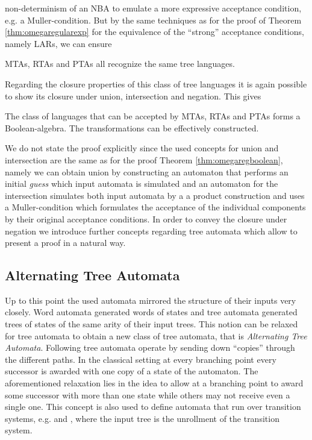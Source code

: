 non-determinism of an \ac{NBA} to emulate a more expressive acceptance 
condition, e.g. a Muller-condition. But by the same techniques as for the proof 
of Theorem \ref{thm:omegaregularexp} for the equivalence of the 
\enquote{strong} acceptance conditions, namely \acp{LAR}, we can ensure
\begin{theorem}
  \cite[Theorem 8.7]{AutoLogInfGames}
  \acp{MTA}, \acp{RTA} and \acp{PTA} all recognize the same tree languages.
  \label{thm:treeautoequiv}
\end{theorem}
Regarding the closure properties of this class of tree languages it is again
possible to show its closure under union, intersection and negation. This gives
\begin{theorem}
  \cite[Theorem 1.3]{SOTheoAndTrees}
  \cite[Theorem 1.5]{SOTheoAndTrees}
  The class of languages that can be accepted by \acp{MTA}, \acp{RTA} and 
  \acp{PTA} forms a Boolean-algebra. The transformations can be effectively
  constructed.
  \label{thm:treeautoboolean}
\end{theorem}
We do not state the proof explicitly since the used concepts for union and
intersection are the same as for the proof Theorem \ref{thm:omegaregboolean},
namely we can obtain union by constructing an automaton that performs an 
initial \emph{guess} which input automata is simulated and an automaton for the
intersection simulates both input automata by a a product construction and uses 
a Muller-condition which formulates the acceptance of the individual components 
by their original acceptance conditions. In order to convey the closure under
negation we introduce further concepts regarding tree automata which allow to
present a proof in a natural way.

\subsection{Alternating Tree Automata}
Up to this point the used automata mirrored the structure of their inputs
very closely. Word automata generated words of states and tree automata 
generated trees of states of the same arity of their input trees. This notion 
can be relaxed for tree automata to obtain a new class of tree
automata, that is \emph{Alternating Tree Automata}. Following 
\cite{AltTreeAuto} tree automata operate by sending down \enquote{copies} 
through the different paths. In the classical setting at every branching point 
every successor is awarded with one copy of a state of the automaton. The 
aforementioned relaxation lies in the idea to allow at a branching point to 
award some successor with more than one state while others may not receive even 
a single one. This concept is also used to define automata that run over 
transition systems, e.g. \cite[Chapter 9]{AutoLogInfGames} and 
\cite{SynProbEnv}, where the input tree is the unrollment of the transition 
system.

